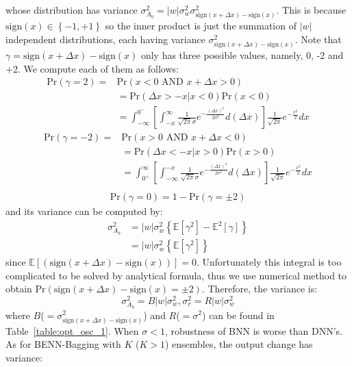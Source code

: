 \documentclass[10pt,twocolumn,letterpaper]{article}
\begin{document}
whose distribution has variance $\sigma_{A_{b}}^{2} = |w|\sigma_{w}^{2}\sigma_{\text{sign}(x+\Delta x)-\text{sign}(x)}^{2}$. This is because $\text{sign}(x)\in\left\{ -1, +1 \right\}$ so the inner product is just the summation of $|w|$ independent distributions, each having variance $\sigma_{\text{sign}(x+\Delta x)-\text{sign}(x)}^{2}$. Note that $\gamma = \text{sign}(x+\Delta x)-\text{sign}(x)$ only has three possible values, namely, 0, -2 and +2. We compute each of them as follows:
\[
    \begin{split}
        \text{Pr}(\gamma = 2) = &\text{Pr}(x < 0 \text{ AND } x+\Delta x > 0)\\
        &= \text{Pr}(\Delta x > -x | x < 0)\text{Pr}(x < 0)\\
        &= \int_{-\infty}^{0^{-}}[\int_{-x}^{\infty}\frac{1}{\sqrt{2\pi}\sigma}e^{-\frac{(\Delta x)^{2}}{2\sigma^{2}}}d(\Delta x)]\frac{1}{\sqrt{2\pi}}e^{-\frac{x^{2}}{2}}dx
    \end{split}
\]
\[
    \begin{split}
        \text{Pr}(\gamma = -2) = &\text{Pr}(x > 0 \text{ AND } x+\Delta x < 0)\\
        &= \text{Pr}(\Delta x < -x | x > 0)\text{Pr}(x > 0)\\
        &= \int_{0^{+}}^{\infty}[\int_{-\infty}^{-x}\frac{1}{\sqrt{2\pi}\sigma}e^{-\frac{(\Delta x)^{2}}{2\sigma^{2}}}d(\Delta x)]\frac{1}{\sqrt{2\pi}}e^{-\frac{x^{2}}{2}}dx\\
    \end{split}
\]
\[
    \begin{split}
        \text{Pr}(\gamma = 0) = 1 - \text{Pr}(\gamma = \pm2)
    \end{split}
\]
and its variance can be computed by:
\[
    \begin{split}
        \sigma_{A_{b}}^{2} &= |w|\sigma_{w}^{2}\left\{\mathbb E[\gamma^{2}] - \mathbb E^{2}[\gamma]\right\}\\
        &= |w|\sigma_{w}^{2}\left\{\mathbb E[\gamma^{2}]\right\}
    \end{split}
\]
since $\mathbb E[(\text{sign}(x+\Delta x)-\text{sign}(x))] = 0$. Unfortunately this integral is too complicated to be solved by analytical formula, thus we use numerical method to obtain $\text{Pr}(\text{sign}(x+\Delta x)-\text{sign}(x) = \pm 2)$. Therefore, the variance is:
\[
    \sigma_{A_{b}}^{2} = B|w|\sigma_{w}^{2}, \sigma_{r}^{2} = R|w|\sigma_{w}^{2} 
\]
where $B$($=\sigma_{\text{sign}(x+\Delta x)-\text{sign}(x)}^{2}$) and $R$($=\sigma^{2}$) can be found in Table~\ref{table:opt_osc_1}. When $\sigma<1$, robustness of BNN is worse than DNN's. As for BENN-Bagging with $K$ ($K>1$) ensembles, the output change has variance:
\end{document}
